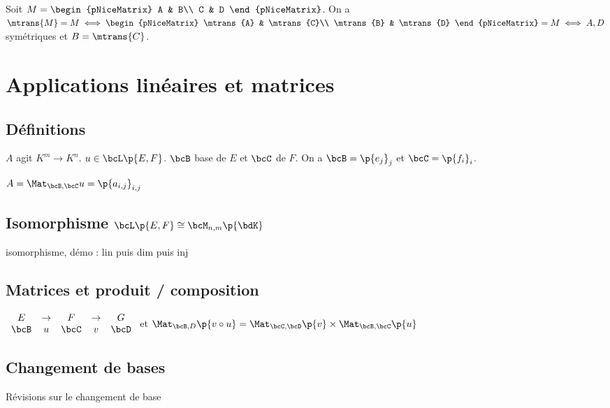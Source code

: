 \documentclass[a4paper,french,bookmarks]{book}
\begin{document}
    
    Soit $M = \begin{pNiceMatrix}
        A & B\\
        C & D
    \end{pNiceMatrix}$. On a $\mtrans{M} = M \iff \begin{pNiceMatrix}
            \mtrans{A} & \mtrans{C}\\
            \mtrans{B} & \mtrans{D}
        \end{pNiceMatrix} = M \iff A, D$ symétriques et $B = \mtrans{C}$.
        
    \section{Applications linéaires et matrices}
    
    \subsection{Définitions}
    
    $A$ agit $K^m \to K^n$. $u \in \bcL\p{E, F}$. $\bcB$ base de $E$ et $\bcC$ de $F$. On a $\bcB = \p{e_j}_j$ et $\bcC = \p{f_i}_i$.
    
    $A = \Mat_{\bcB, \bcC} u = \p{a_{i, j}}_{i, j}$
    
    \subsection{Isomorphisme $\bcL\p{E, F} \cong \bcM_{n, m}\p{\bdK}$}
    
    isomorphisme, démo : lin puis dim puis inj
    
    \subsection{Matrices et produit / composition}
    
    $\begin{array}{ccccc}
        E &\to& F &\to& G  \\
        \bcB & u& \bcC & v& \bcD 
    \end{array}$ et $\Mat_{\bcB, D}\p{v \circ u} = \Mat_{\bcC, \bcD}\p{v} \times \Mat_{\bcB, \bcC}\p{u}$
    
    \subsection{Changement de bases}
    
    Révisions sur le changement de base
    
\end{document}
